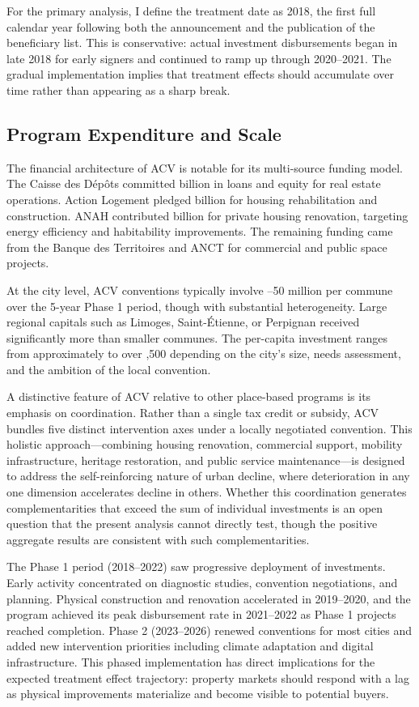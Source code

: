 \documentclass[12pt]{article}
\newcommand{\euro}{\texteuro}
\begin{document}
For the primary analysis, I define the treatment date as 2018, the first full calendar year following both the announcement and the publication of the beneficiary list. This is conservative: actual investment disbursements began in late 2018 for early signers and continued to ramp up through 2020--2021. The gradual implementation implies that treatment effects should accumulate over time rather than appearing as a sharp break.

\subsection{Program Expenditure and Scale}

The financial architecture of ACV is notable for its multi-source funding model. The Caisse des D\'{e}p\^{o}ts committed \euro 1.7 billion in loans and equity for real estate operations. Action Logement pledged \euro 1.5 billion for housing rehabilitation and construction. ANAH contributed \euro 1.2 billion for private housing renovation, targeting energy efficiency and habitability improvements. The remaining funding came from the Banque des Territoires and ANCT for commercial and public space projects.

At the city level, ACV conventions typically involve \euro 10--50 million per commune over the 5-year Phase 1 period, though with substantial heterogeneity. Large regional capitals such as Limoges, Saint-\'{E}tienne, or Perpignan received significantly more than smaller communes. The per-capita investment ranges from approximately \euro 200 to over \euro 1,500 depending on the city's size, needs assessment, and the ambition of the local convention.

A distinctive feature of ACV relative to other place-based programs is its emphasis on coordination. Rather than a single tax credit or subsidy, ACV bundles five distinct intervention axes under a locally negotiated convention. This holistic approach---combining housing renovation, commercial support, mobility infrastructure, heritage restoration, and public service maintenance---is designed to address the self-reinforcing nature of urban decline, where deterioration in any one dimension accelerates decline in others. Whether this coordination generates complementarities that exceed the sum of individual investments is an open question that the present analysis cannot directly test, though the positive aggregate results are consistent with such complementarities.

The Phase 1 period (2018--2022) saw progressive deployment of investments. Early activity concentrated on diagnostic studies, convention negotiations, and planning. Physical construction and renovation accelerated in 2019--2020, and the program achieved its peak disbursement rate in 2021--2022 as Phase 1 projects reached completion. Phase 2 (2023--2026) renewed conventions for most cities and added new intervention priorities including climate adaptation and digital infrastructure. This phased implementation has direct implications for the expected treatment effect trajectory: property markets should respond with a lag as physical improvements materialize and become visible to potential buyers.
\end{document}

